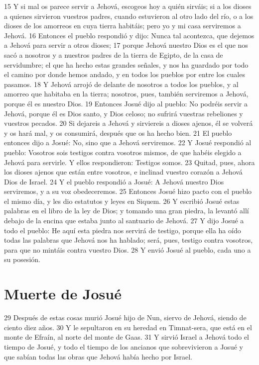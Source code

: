 15 Y si mal os parece servir a Jehová, escogeos hoy a quién sirváis; si a los dioses a quienes sirvieron vuestros padres, cuando estuvieron al otro lado del río, o a los dioses de los amorreos en cuya tierra habitáis; pero yo y mi casa serviremos a Jehová.
16 Entonces el pueblo respondió y dijo: Nunca tal acontezca, que dejemos a Jehová para servir a otros dioses;
17 porque Jehová nuestro Dios es el que nos sacó a nosotros y a nuestros padres de la tierra de Egipto, de la casa de servidumbre; el que ha hecho estas grandes señales, y nos ha guardado por todo el camino por donde hemos andado, y en todos los pueblos por entre los cuales pasamos.
18 Y Jehová arrojó de delante de nosotros a todos los pueblos, y al amorreo que habitaba en la tierra; nosotros, pues, también serviremos a Jehová, porque él es nuestro Dios.
19 Entonces Josué dijo al pueblo: No podréis servir a Jehová, porque él es Dios santo, y Dios celoso; no sufrirá vuestras rebeliones y vuestros pecados.
20 Si dejareis a Jehová y sirviereis a dioses ajenos, él se volverá y os hará mal, y os consumirá, después que os ha hecho bien.
21 El pueblo entonces dijo a Josué: No, sino que a Jehová serviremos.
22 Y Josué respondió al pueblo: Vosotros sois testigos contra vosotros mismos, de que habéis elegido a Jehová para servirle. Y ellos respondieron: Testigos somos.
23 Quitad, pues, ahora los dioses ajenos que están entre vosotros, e inclinad vuestro corazón a Jehová Dios de Israel.
24 Y el pueblo respondió a Josué: A Jehová nuestro Dios serviremos, y a su voz obedeceremos.
25 Entonces Josué hizo pacto con el pueblo el mismo día, y les dio estatutos y leyes en Siquem.
26 Y escribió Josué estas palabras en el libro de la ley de Dios; y tomando una gran piedra, la levantó allí debajo de la encina que estaba junto al santuario de Jehová.
27 Y dijo Josué a todo el pueblo: He aquí esta piedra nos servirá de testigo, porque ella ha oído todas las palabras que Jehová nos ha hablado; será, pues, testigo contra vosotros, para que no mintáis contra vuestro Dios.
28 Y envió Josué al pueblo, cada uno a su posesión.
\section*{Muerte de Josué}

29 Después de estas cosas murió Josué hijo de Nun, siervo de Jehová, siendo de ciento diez años.
30 Y le sepultaron en su heredad en Timnat-sera, que está en el monte de Efraín, al norte del monte de Gaas.
31 Y sirvió Israel a Jehová todo el tiempo de Josué, y todo el tiempo de los ancianos que sobrevivieron a Josué y que sabían todas las obras que Jehová había hecho por Israel.
